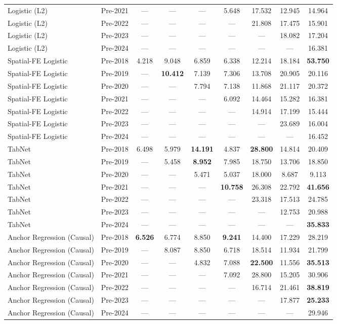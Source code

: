 \begin{table}[htbp]
{\begin{tabular}{l lccccccc}
Logistic (L2) & Pre-2021 & --- & --- & --- & 5.648 & 17.532 & 12.945 & 14.964 \\
Logistic (L2) & Pre-2022 & --- & --- & --- & --- & 21.808 & 17.475 & 15.901 \\
Logistic (L2) & Pre-2023 & --- & --- & --- & --- & --- & 18.082 & 17.204 \\
Logistic (L2) & Pre-2024 & --- & --- & --- & --- & --- & --- & 16.381 \\
Spatial-FE Logistic & Pre-2018 & 4.218 & 9.048 & 6.859 & 6.338 & 12.214 & 18.184 & \textbf{53.750} \\
Spatial-FE Logistic & Pre-2019 & --- & \textbf{10.412} & 7.139 & 7.306 & 13.708 & 20.905 & 20.116 \\
Spatial-FE Logistic & Pre-2020 & --- & --- & 7.794 & 7.138 & 11.868 & 21.117 & 20.372 \\
Spatial-FE Logistic & Pre-2021 & --- & --- & --- & 6.092 & 14.464 & 15.282 & 16.381 \\
Spatial-FE Logistic & Pre-2022 & --- & --- & --- & --- & 14.914 & 17.199 & 15.444 \\
Spatial-FE Logistic & Pre-2023 & --- & --- & --- & --- & --- & 23.689 & 16.004 \\
Spatial-FE Logistic & Pre-2024 & --- & --- & --- & --- & --- & --- & 16.452 \\
TabNet & Pre-2018 & 6.498 & 5.979 & \textbf{14.191} & 4.837 & \textbf{28.800} & 14.814 & 20.409 \\
TabNet & Pre-2019 & --- & 5.458 & \textbf{8.952} & 7.985 & 18.750 & 13.706 & 18.850 \\
TabNet & Pre-2020 & --- & --- & 5.471 & 5.037 & 18.000 & 8.687 & 9.113 \\
TabNet & Pre-2021 & --- & --- & --- & \textbf{10.758} & 26.308 & 22.792 & \textbf{41.656} \\
TabNet & Pre-2022 & --- & --- & --- & --- & 23.318 & 17.513 & 24.785 \\
TabNet & Pre-2023 & --- & --- & --- & --- & --- & 12.753 & 20.988 \\
TabNet & Pre-2024 & --- & --- & --- & --- & --- & --- & \textbf{35.833} \\
Anchor Regression (Causal) & Pre-2018 & \textbf{6.526} & 6.774 & 8.850 & \textbf{9.241} & 14.400 & 17.229 & 28.219 \\
Anchor Regression (Causal) & Pre-2019 & --- & 8.087 & 8.850 & 6.718 & 18.514 & 11.934 & 21.799 \\
Anchor Regression (Causal) & Pre-2020 & --- & --- & 4.832 & 7.088 & \textbf{22.500} & 11.556 & \textbf{35.513} \\
Anchor Regression (Causal) & Pre-2021 & --- & --- & --- & 7.092 & 28.800 & 15.205 & 30.906 \\
Anchor Regression (Causal) & Pre-2022 & --- & --- & --- & --- & 16.714 & 21.461 & \textbf{38.819} \\
Anchor Regression (Causal) & Pre-2023 & --- & --- & --- & --- & --- & 17.877 & \textbf{25.233} \\
Anchor Regression (Causal) & Pre-2024 & --- & --- & --- & --- & --- & --- & 29.946 \\
\bottomrule
\end{tabular}%
}
\end{table}